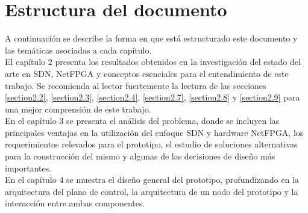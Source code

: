                    


\section{Estructura del documento}

A continuación se describe la forma en que est\'a estructurado este documento y las temáticas asociadas a cada cap\'itulo.\\

El cap\'itulo 2 presenta los resultados obtenidos en la investigación del estado del arte en SDN, NetFPGA y conceptos esenciales para el entendimiento de este trabajo. Se recomienda al lector fuertemente la lectura de las secciones \ref{section2.2}, \ref{section2.3}, \ref{section2.4}, 
 \ref{section2.7}, \ref{section2.8} y \ref{section2.9} para una mejor comprensión de este trabajo.\\

En el cap\'itulo 3 se presenta el análisis del problema, donde se incluyen las principales ventajas en la utilización del enfoque SDN y hardware NetFPGA, los requerimientos relevados para el prototipo, el estudio de soluciones alternativas para la construcción del mismo y algunas de las decisiones de diseño m\'as importantes.\\

En el cap\'itulo 4 se muestra el diseño general del prototipo, profundizando en la arquitectura del plano de control, la arquitectura de un nodo del prototipo y la interacción entre ambas componentes.\\

